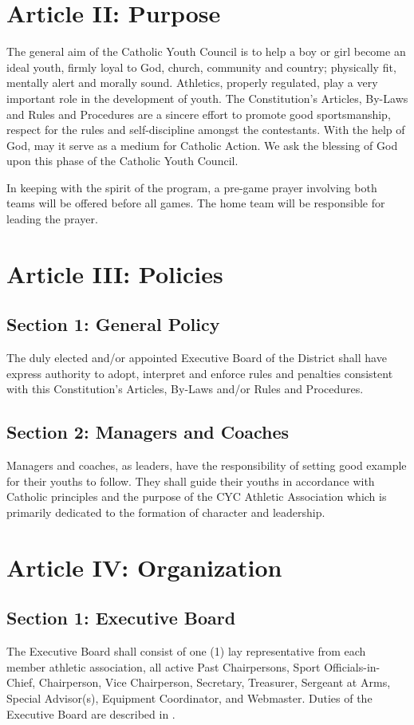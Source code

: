 \documentclass[letteraper,10pt,oneside,draft]{memoir}
\begin{document}
\section{Article II: Purpose}
\label{sec:const-2}
The general aim of the Catholic Youth Council is to help a boy or girl become an ideal youth, firmly loyal to God, church, community and country; physically fit, mentally alert and morally sound.  Athletics, properly regulated, play a very important role in the development of youth.  The Constitution’s Articles, By-Laws and Rules and Procedures are a sincere effort to promote good sportsmanship, respect for the rules and self-discipline amongst the contestants.  With the help of God, may it serve as a medium for Catholic Action.  We ask the blessing of God upon this phase of the Catholic Youth Council.

In keeping with the spirit of the program, a pre-game prayer involving both teams will be offered before all games. The home team will be responsible for leading the prayer.

\section{Article III: Policies}
\label{sec:const-3}
\subsection{Section 1: General Policy}
\label{ssec:const-3-1}
The duly elected and/or appointed Executive Board of the District shall have express authority to adopt, interpret and enforce rules and penalties consistent with this Constitution’s Articles, By-Laws and/or Rules and Procedures.

\subsection{Section 2: Managers and Coaches}
\label{ssec:const-3-2}
Managers and coaches, as leaders, have the responsibility of setting good example for their youths to follow.  They  shall guide their youths in accordance with Catholic principles and the purpose of the CYC Athletic Association  which is primarily dedicated to the formation of character and leadership.

\section{Article IV: Organization}
\label{sec:const-4]}
\subsection{Section 1: Executive Board}
\label{ssec:const-4-1}
The Executive Board shall consist of one (1) lay representative from each member athletic association, all active Past Chairpersons, Sport Officials-in-Chief, Chairperson, Vice Chairperson, Secretary, Treasurer, Sergeant at Arms, Special Advisor(s), Equipment Coordinator, and Webmaster.  Duties of the Executive Board are described in .
\end{document}
